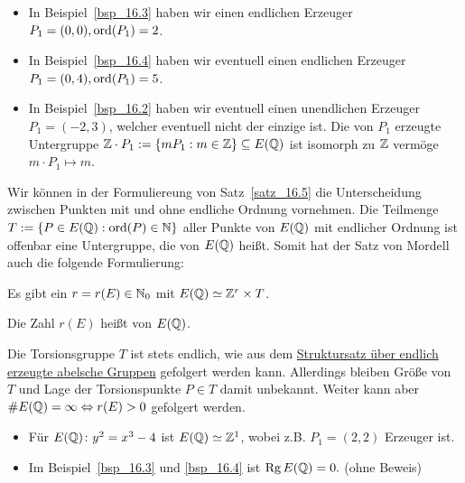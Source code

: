 \begin{bem}
	\begin{itemize}
		\item In Beispiel~\ref{bsp_16.3} haben wir einen endlichen Erzeuger $P_1 = (0,0), \operatorname{ord}(P_1) = 2$.
		\item In Beispiel~\ref{bsp_16.4} haben wir eventuell einen endlichen Erzeuger $P_1 = (0,4), \operatorname{ord}(P_1)=5$.
		\item In Beispiel~\ref{bsp_16.2} haben wir eventuell einen unendlichen Erzeuger $P_1 = (-2,3)$, welcher eventuell nicht der einzige ist. Die von $P_1$ erzeugte Untergruppe $\mathbb{Z} \cdot P_1 := \{m P_1 : m \in \mathbb{Z}\} \subseteq E(\mathbb{Q})$ ist isomorph zu $\mathbb{Z}$ vermöge $m \cdot P_1 \mapsto m$.
	\end{itemize}
\end{bem}

\begin{defn}[Torsionsgruppe]
	Wir können in der Formuliereung von Satz~\ref{satz_16.5} die Unterscheidung zwischen Punkten mit und ohne endliche Ordnung vornehmen.
	Die Teilmenge $T := \{P \in E(\mathbb{Q}) : \operatorname{ord}(P) \in \mathbb{N}\}$ aller Punkte von $E(\mathbb{Q})$ mit endlicher Ordnung ist offenbar eine Untergruppe, die  von $E(\mathbb{Q})$ heißt.
	Somit hat der Satz von Mordell auch die folgende Formulierung:
\end{defn}

\begin{satz}
	Es gibt ein $r = r(E) \in \mathbb{N}_0$ mit $E(\mathbb{Q}) \simeq \mathbb{Z}^r \times T$. 
\end{satz}

\begin{defn}[Rang]
\label{def_16.9}
	Die Zahl $r(E)$ heißt  von $E(\mathbb{Q})$.
\end{defn}

\begin{bem}
	Die Torsionsgruppe $T$ ist stets endlich, wie aus dem 	\href{https://de.wikipedia.org/wiki/Hauptsatz_\%C3\%BCber_endlich_erzeugte_abelsche_Gruppen}{Struktursatz über endlich erzeugte abelsche Gruppen} gefolgert werden kann.
	Allerdings bleiben Größe von $T$ und Lage der Torsionspunkte $P \in T$ damit unbekannt.
	Weiter kann aber $\#E(\mathbb{Q}) = \infty \Leftrightarrow r(E) > 0$ gefolgert werden.
\end{bem}

\begin{bsp}
	\begin{itemize}
		\item Für $E(\mathbb{Q}) \colon y^2 = x^3 - 4$ ist $E(\mathbb{Q}) \simeq \mathbb{Z}^1$, wobei z.B. $P_1 = (2,2)$ Erzeuger ist.
		\item Im Beispiel~\ref{bsp_16.3} und \ref{bsp_16.4} ist $\operatorname{Rg} E(\mathbb{Q}) = 0.$ (ohne Beweis)
	\end{itemize}
\end{bsp}

